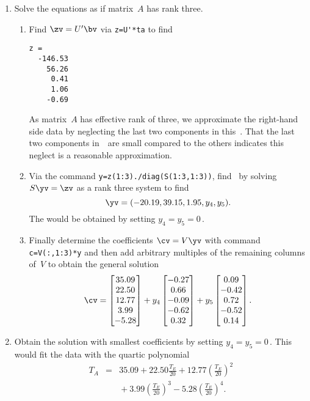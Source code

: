 \begin{example}
\begin{solution}
\begin{enumerate}
\item Solve the equations as if matrix~\(A\) has rank three.
\begin{enumerate}
\item Find \(\zv=U'\bv\) via \verb|z=U'*ta| to find
\begin{verbatim}
z =
  -146.53
    56.26
     0.41
     1.06
    -0.69
\end{verbatim}
As matrix~\(A\) has effective rank of three, we approximate the right-hand side data by neglecting the last two components in this~\zv.
That the last two components in~\zv\ are small compared to the others indicates this neglect is a reasonable approximation.

\item Via the command \verb|y=z(1:3)./diag(S(1:3,1:3))|, find \yv\ by solving \(S\yv=\zv\) as a rank three system to find \twodp
\begin{equation*}
\yv=(-20.19,39.15,1.95,y_4,y_5).
\end{equation*}
The  would be obtained by setting \(y_4=y_5=0\)\,.

\item Finally determine the coefficients \(\cv=V\yv\) with command \verb|c=V(:,1:3)*y| and then add arbitrary multiples of the remaining columns of~\(V\) to obtain the general solution \twodp
\begin{equation*}
\cv=
\begin{bmatrix} 35.09 \\22.50 \\12.77 \\3.99 \\-5.28 \end{bmatrix}
+y_4\begin{bmatrix} -0.27
\\0.66
\\-0.09
\\-0.62
\\0.32 \end{bmatrix}
+y_5\begin{bmatrix} 0.09
\\-0.42
\\0.72
\\-0.52
\\0.14 \end{bmatrix}.
\end{equation*}
\end{enumerate}

\item Obtain the solution with smallest coefficients by setting \(y_4=y_5=0\)\,.
This would fit the data with the quartic polynomial
\begin{eqnarray*}
T_A&=&35.09+22.50\frac{T_E}{20} 
+12.77\left(\frac{T_E}{20}\right)^2
\\&&{}
+3.99\left(\frac{T_E}{20}\right)^3
-5.28\left(\frac{T_E}{20}\right)^4.
\end{eqnarray*}


\end{enumerate}
\end{solution}
\end{example}
